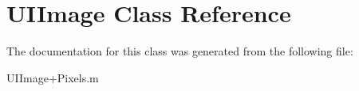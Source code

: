 \hypertarget{class_u_i_image}{\section{\-U\-I\-Image \-Class \-Reference}
\label{class_u_i_image}
}


\-The documentation for this class was generated from the following file\-:\begin{DoxyCompactItemize}
\item 
\-U\-I\-Image+\-Pixels.\-m\end{DoxyCompactItemize}
